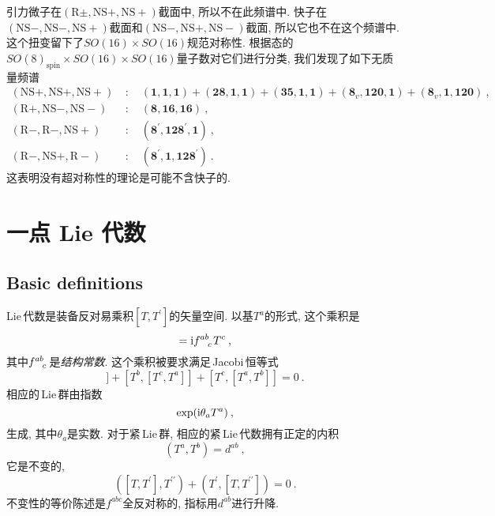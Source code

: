 引力微子在$ (\mathrm{R}\pm,\mathrm{NS}+,\mathrm{NS}+) $截面中, 所以不在此频谱中. 快子在$ (\mathrm{NS}-,\mathrm{NS}-,\mathrm{NS}+) $截面和$ (\mathrm{NS}-,\mathrm{NS}+,\mathrm{NS}-) $截面, 所以它也不在这个频谱中. 这个扭变留下了$ SO(16)\times SO(16) $规范对称性. 根据态的$ SO(8)_{\text{spin}}\times SO(16)\times SO(16) $量子数对它们进行分类, 我们发现了如下无质量频谱
\begin{align*}
    (\mathrm{NS}+,\mathrm{NS}+,\mathrm{NS}+)&\::\quad (\mathbf{1},\mathbf{1},\mathbf{1}) 
    + (\mathbf{28},\mathbf{1},\mathbf{1}) + (\mathbf{35},\mathbf{1},\mathbf{1})
    + (\mathbf{8}_{v},\mathbf{120},\mathbf{1}) + (\mathbf{8}_{v},\mathbf{1},\mathbf{120}) \:, \\
    (\mathrm{R}+,\mathrm{NS}-,\mathrm{NS}-)&\::\quad (\mathbf{8},\mathbf{16},\mathbf{16})\: , \\
    (\mathrm{R}-,\mathrm{R}-,\mathrm{NS}+)&\::\quad  (\mathbf{8}^{\prime},\mathbf{128}^{\prime},\mathbf{1})\:, \\
    (\mathrm{R}-,\mathrm{NS}+,\mathrm{R}-)&\::\quad (\mathbf{8}^{\prime},\mathbf{1},\mathbf{128}^{\prime})\:.
\end{align*}
这表明没有超对称性的理论是可能不含快子的.


\section{一点 Lie 代数}

\subsection*{Basic definitions}

Lie\,代数是装备反对易乘积$ [T,T^{\prime}] $的矢量空间. 以基$ T^{a} $的形式, 这个乘积是
\begin{equation}
    [T^{a},T^{b}] = \mi f\indices{^a^b_c}T^{c} \:, \label{11.4.1}
\end{equation}
其中$ f\indices{^a^b_c} $是{\emph{结构常数}}. 这个乘积被要求满足\,Jacobi\,恒等式
\begin{equation}
    [T^{a},[T^{b},T^{c}]] + [T^{b},[T^{c},T^{a}]] + [T^{c},[T^{a},T^{b}]] =0 \:.\label{11.4.2}
\end{equation}
相应的\,Lie\,群由指数
\begin{equation}
    \exp(\mathrm{i}\theta_{a}T^{a}) \:, \label{11.4.3}
\end{equation}
生成, 其中$ \theta_{a} $是实数. 对于紧\,Lie\,群, 相应的紧\,Lie\,代数拥有正定的内积
\begin{equation}
    (T^{a},T^{b}) = d^{ab} \:, \label{11.4.4}
\end{equation}
它是不变的,
\begin{equation}
    ([T,T^{\prime}],T^{\prime\prime}) + (T^{\prime},[T,T^{\prime\prime}]) =0\:. \label{11.4.5}
\end{equation}
不变性的等价陈述是$ f^{abc} $全反对称的, 指标用$ d^{ab} $进行升降.

